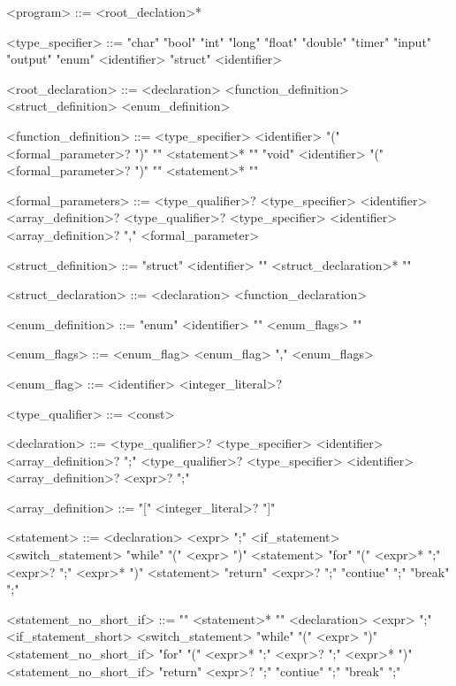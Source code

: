 \begin{grammar}
 
 
 
 
 <program> ::= <root\_declation>*
 
 <type\_specifier> ::= "char"
 \alt "bool"
 \alt "int"
 \alt "long"
 \alt "float"
 \alt "double"
 \alt "timer"
 \alt "input"
 \alt "output"
 \alt "enum" <identifier>
 \alt "struct" <identifier>
 
 <root\_declaration> ::= <declaration>
 \alt <function\_definition>
 \alt <struct\_definition>
 \alt <enum\_definition>
 
 <function\_definition> ::= <type\_specifier> <identifier> "(" <formal\_parameter>? ")" "{" <statement>* "}"
 \alt "void" <identifier> "(" <formal\_parameter>? ")" "{" <statement>* "}"
 
 <formal\_parameters> ::= <type\_qualifier>? <type\_specifier> <identifier> <array\_definition>?
 \alt <type\_qualifier>? <type\_specifier> <identifier> <array\_definition>? "," <formal\_parameter>
 
 <struct\_definition> ::= "struct" <identifier> "{" <struct\_declaration>* "}"
 
 <struct\_declaration> ::= <declaration>
 \alt <function\_declaration>
 
 <enum\_definition> ::= "enum" <identifier> "{" <enum\_flags> "}"
 
 <enum\_flags> ::= <enum\_flag>
 \alt <enum\_flag> "," <enum\_flags>
 
 <enum\_flag> ::= <identifier> <integer\_literal>?
 
 <type\_qualifier> ::= <const>
 
 <declaration> ::= <type\_qualifier>? <type\_specifier> <identifier> <array\_definition>? ";"
 \alt <type\_qualifier>? <type\_specifier> <identifier> <array\_definition>? <expr>? ";"
 
 <array\_definition> ::= "[" <integer\_literal>? "]"
 
 <statement> ::= <declaration>
 \alt <expr> ";"
 \alt <if\_statement>
 \alt <switch\_statement>
 \alt "while" "(" <expr> ")" <statement>
 \alt "for" "(" <expr>* ";" <expr>? ";" <expr>* ")" <statement>
 \alt "return" <expr>? ";"
 \alt "contiue" ";"
 \alt "break" ";"
 
 <statement\_no\_short\_if> ::= "{" <statement>* "}"
 \alt <declaration>
 \alt <expr> ";"
 \alt <if\_statement\_short>
 \alt <switch\_statement>
 \alt "while" "(" <expr> ")" <statement\_no\_short\_if>
 \alt "for" "(" <expr>* ";" <expr>? ";" <expr>* ")" <statement\_no\_short\_if>
 \alt "return" <expr>? ";"
 \alt "contiue" ";"
 \alt "break" ";"
 

\end{grammar}
